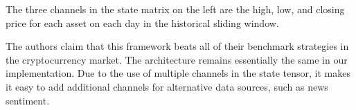 The three channels in the state matrix on the left are the high, low, and closing price for each asset on each day in the historical sliding window.

The authors claim that this framework beats all of their benchmark strategies in the cryptocurrency market.
The architecture remains essentially the same in our implementation. Due to the use of multiple channels in the state tensor, it makes it easy to
add additional channels for alternative data sources, such as news sentiment.
